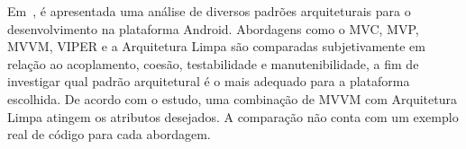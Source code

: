 Em~\cite{akhtar}, é apresentada uma análise de diversos padrões arquiteturais para o desenvolvimento na plataforma Android.
Abordagens como o MVC, MVP, MVVM, VIPER e a Arquitetura Limpa são comparadas subjetivamente em relação ao acoplamento, coesão, testabilidade e manutenibilidade, a fim de investigar qual padrão arquitetural é o mais adequado para a plataforma escolhida.
De acordo com o estudo, uma combinação de MVVM com Arquitetura Limpa atingem os atributos desejados.
A comparação não conta com um exemplo real de código para cada abordagem.